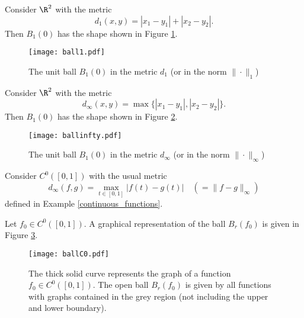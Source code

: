 \np

\begin{example}
Consider $\R^2$ with the metric
\[
d_1(x,y) = |x_1 - y_1| + |x_2 - y_2|.
\]%
Then $B_1(0)$ has the shape shown in Figure \ref{fig:ball1}.
\begin{figure}[ht]
\begin{center}
\texttt{[image: ball1.pdf]}
\caption{The unit ball $B_1(0)$ in the metric $d_1$ (or in the norm $\|\cdot\|_{1}$)}
\label{fig:ball1}
\end{center}
\end{figure}
\end{example}

\begin{example}
Consider $\R^2$ with the metric
\[
d_\infty(x,y) = \max\{|x_1 - y_1|,|x_2 - y_2|\}.
\]%
Then $B_1(0)$ has the shape shown in Figure \ref{fig:ballinfty}.
\begin{figure}[ht]
\begin{center}
\texttt{[image: ballinfty.pdf]}
\caption{The unit ball $B_1(0)$ in the metric $d_\infty$ (or in the norm $\|\cdot\|_{\infty}$)}
\label{fig:ballinfty}
\end{center}
\end{figure}
\end{example}

\begin{example}
Consider $C^0([0,1])$ with the usual metric
\[
d_\infty(f,g) = \max_{t \in [0,1]} |f(t) - g(t)| \quad (=\|f-g\|_\infty)
\]%
defined in Example \ref{continuous_functions}.

Let $f_0 \in C^0([0,1])$. A graphical representation of the ball $B_r(f_0)$ is given in Figure \ref{fig:ballC0}.
\begin{figure}[ht]
\begin{center}
\texttt{[image: ballC0.pdf]}
\caption{The thick solid curve represents the graph of a function $f_0 \in C^0([0,1])$. The open ball $B_r(f_0)$ is given by all functions with graphs contained in the grey region (not including the upper and lower boundary).}
\label{fig:ballC0}
\end{center}
\end{figure}
\end{example}


